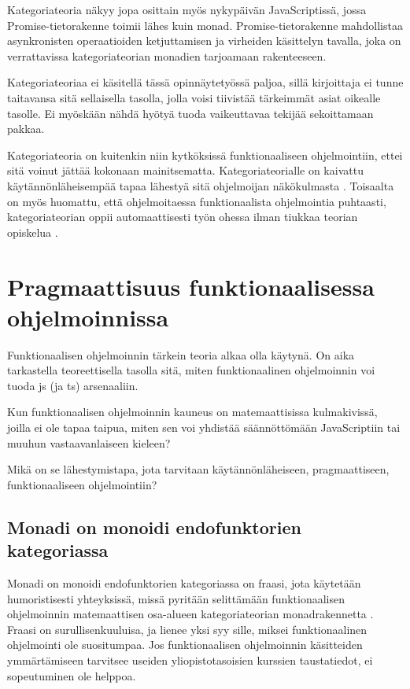 Kategoriateoria näkyy jopa osittain myös nykypäivän JavaScriptissä, jossa Promise-tietorakenne toimii lähes kuin \gls{monad}. Promise-tietorakenne mahdollistaa asynkronisten operaatioiden ketjuttamisen ja virheiden käsittelyn tavalla, joka on verrattavissa kategoriateorian monadien tarjoamaan rakenteeseen. \citep{promises-spec-94,stackoverflow:why_monad}

Kategoriateoriaa ei käsitellä tässä opinnäytetyössä paljoa, sillä kirjoittaja ei tunne taitavansa sitä sellaisella tasolla, jolla voisi tiivistää tärkeimmät asiat oikealle tasolle. Ei myöskään nähdä hyötyä tuoda vaikeuttavaa tekijää sekoittamaan pakkaa.

Kategoriateoria on kuitenkin niin kytköksissä funktionaaliseen ohjelmointiin, ettei sitä voinut jättää kokonaan mainitsematta. Kategoriateorialle on kaivattu käytännönläheisempää tapaa lähestyä sitä ohjelmoijan näkökulmasta \cite{holvikari2021category}. Toisaalta on myös huomattu, että ohjelmoitaessa funktionaalista ohjelmointia puhtaasti, kategoriateorian oppii automaattisesti työn ohessa ilman tiukkaa teorian opiskelua \cite{holvikari2021category}.


\section{Pragmaattisuus funktionaalisessa ohjelmoinnissa}

Funktionaalisen ohjelmoinnin tärkein teoria alkaa olla käytynä. On aika tarkastella teoreettisella tasolla sitä, miten funktionaalinen ohjelmoinnin voi tuoda \gls{js} (ja \gls{ts}) arsenaaliin.

Kun funktionaalisen ohjelmoinnin kauneus on matemaattisissa kulmakivissä, joilla ei ole tapaa taipua, miten sen voi yhdistää säännöttömään JavaScriptiin tai muuhun vastaavanlaiseen kieleen?

Mikä on se lähestymistapa, jota tarvitaan käytännönläheiseen, pragmaattiseen, funktionaaliseen ohjelmointiin?

\subsection{Monadi on monoidi endofunktorien kategoriassa}

Monadi on monoidi endofunktorien kategoriassa on fraasi, jota käytetään humoristisesti yhteyksissä, missä pyritään selittämään funktionaalisen ohjelmoinnin matemaattisen osa-alueen kategoriateorian \gls{monad}rakennetta \cite{bartosz_category_for_progamers_10}. Fraasi on surullisenkuuluisa, ja lienee yksi syy sille, miksei funktionaalinen ohjelmointi ole suositumpaa. Jos funktionaalisen ohjelmoinnin käsitteiden ymmärtämiseen tarvitsee useiden yliopistotasoisien kurssien taustatiedot, ei sopeutuminen ole helppoa.

